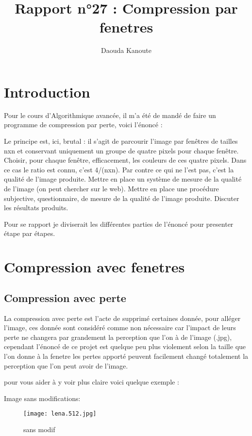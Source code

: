 \documentclass{article}
\title{Rapport n°27 : Compression par fenetres}
\author{Daouda Kanoute}
\begin{document}
\maketitle


\section{Introduction}
Pour le cours d'Algorithmique avancée, il m'a été de mandé de faire un programme de compression par perte, voici l'énoncé : 

Le principe est, ici, brutal : il
s’agit de parcourir l’image par fenêtres de tailles
nxn et conservant uniquement un groupe de quatre
pixels pour chaque fenêtre. Choisir, pour chaque
fenêtre, efficacement, les couleurs de ces quatre
pixels.
Dans ce cas le ratio est connu, c’est 4/(nxn). Par
contre ce qui ne l’est pas, c’est la qualité de l’image
produite.
Mettre en place un système de mesure de la qualité
de l’image (on peut chercher sur le web).
Mettre en place une procédure subjective, questionnaire, de mesure de la qualité de l’image
produite.
Discuter les résultats produits.

Pour se rapport je diviserait les différentes parties de l'énoncé pour presenter étape par étapes.

\section{Compression avec fenetres}

\subsection{Compression avec perte}
La compression avec perte est l'acte de supprimé certaines donnée, pour alléger l'image, ces donnée sont considéré comme non nécessaire car l'impact de leurs perte ne changera par grandement la perception que l'on à de l'image (.jpg), cependant l'énoncé de ce projet est quelque peu plus violement selon la taille que l'on donne à la fenetre les pertes apporté peuvent facilement changé totalement la perception que l'on peut avoir de l'image.

pour vous aider à y voir plus claire voici quelque exemple :

Image sans modifications:
 \begin{figure}
 \centering
 \texttt{[image: lena.512.jpg]}
 \caption{\label{fig:blank}sans modif}
 \end{figure}
 
\end{document}
